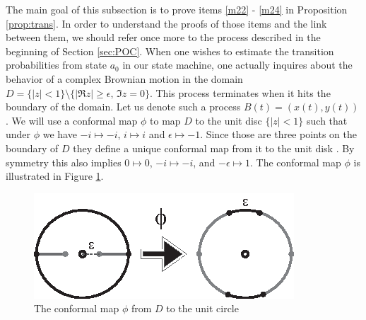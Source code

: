 {The main goal of this subsection is to prove items \ref{m22} - \ref{m24} in Proposition
 \ref{prop:trans}. In order to understand the proofs of those items and the link
  between them, we should refer once more to the process described in the
   beginning of Section \ref{sec:POC}. When one wishes to estimate the
   transition probabilities from state $a_0$ in our state machine, one
   actually inquires about the behavior of a complex Brownian motion in
   the domain $D=\{|z|<1\}\setminus\{|\Re z|\ge\epsilon,\,\Im z=0\}$. This
   process terminates when it hits the boundary of the domain. Let us
   denote such a process $B(t)=(x(t),y(t))$. We will use a conformal
    map $\phi$ to map $D$ to the unit disc $\{|z|<1\}$ such that
    under $\phi$ we have $-i \mapsto-i$, $i\mapsto i$ and
    $\epsilon\mapsto-1$. Since those are three points on the
     boundary of $D$ they define a unique conformal map from it
      to the unit disk . By symmetry
      this also implies $0\mapsto0$, $-i\mapsto -i$, and
       $-\epsilon\mapsto1$. The conformal map $\phi$ is
       illustrated in Figure \ref{fig:conf_map}.
\begin{figure}[htb]
\begin{center}
\leavevmode
\includegraphics{conformal_map.eps}
\end{center}
\caption{The conformal map $\phi$ from $D$ to the unit circle}
\label{fig:conf_map}
\end{figure}

}
